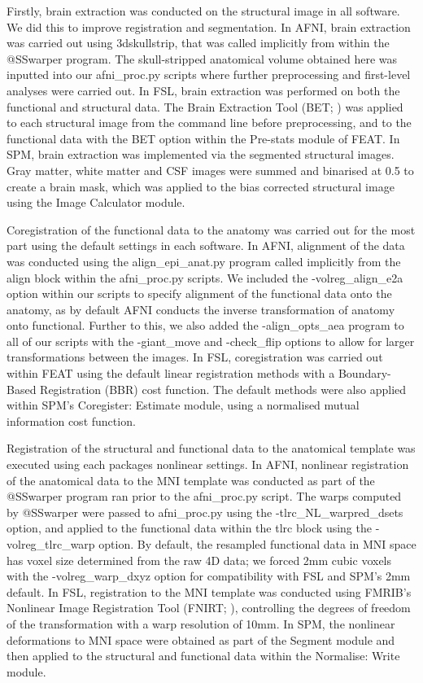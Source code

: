 Firstly, brain extraction was conducted on the structural image in all software. We did this to improve registration and segmentation. In AFNI, brain extraction was carried out using 3dskullstrip, that was called implicitly from within the @SSwarper program. The skull-stripped anatomical volume obtained here was inputted into our afni\_proc.py scripts where further preprocessing and first-level analyses were carried out.  In FSL, brain extraction was performed on both the functional and structural data. The Brain Extraction Tool (BET; \citep{Smith2002-vw}) was applied to each structural image from the command line before preprocessing, and to the functional data with the BET option within the Pre-stats module of FEAT. In SPM, brain extraction was implemented via the segmented structural images. Gray matter, white matter and CSF images were summed and binarised at 0.5 to create a brain mask, which was applied to the bias corrected structural image using the Image Calculator module. 

Coregistration of the functional data to the anatomy was carried out for the most part using the default settings in each software. In AFNI, alignment of the data was conducted using the align\_epi\_anat.py program called implicitly from the align block within the afni\_proc.py scripts. We included the -volreg\_align\_e2a option within our scripts to specify alignment of the functional data onto the anatomy, as by default AFNI conducts the inverse transformation of anatomy onto functional. Further to this, we also added the -align\_opts\_aea program to all of our scripts with the -giant\_move and -check\_flip options to allow for larger transformations between the images. In FSL, coregistration was carried out within FEAT using the default linear registration methods with a Boundary-Based Registration (BBR) cost function. The default methods were also applied within SPM's Coregister: Estimate module, using a normalised mutual information cost function. 

Registration of the structural and functional data to the anatomical template was executed using each packages nonlinear settings. In AFNI, nonlinear registration of the anatomical data to the MNI template was conducted as part of the @SSwarper program ran prior to the afni\_proc.py script. The warps computed by @SSwarper were passed to afni\_proc.py using the -tlrc\_NL\_warpred\_dsets option, and applied to the functional data within the tlrc block using the -volreg\_tlrc\_warp option. By default, the resampled functional data in MNI space has voxel size determined from the raw 4D data; we forced 2mm cubic voxels with the -volreg\_warp\_dxyz option for compatibility with FSL and SPM's 2mm default. In FSL, registration to the MNI template was conducted using FMRIB's Nonlinear Image Registration Tool (FNIRT; \citep{Andersson2007-lc}), controlling the degrees of freedom of the transformation with a warp resolution of 10mm. In SPM, the nonlinear deformations to MNI space were obtained as part of the Segment module and then applied to the structural and functional data within the Normalise: Write module. 

